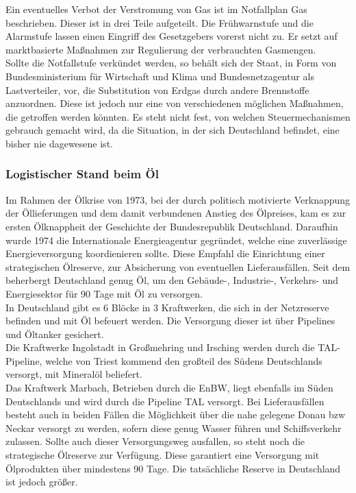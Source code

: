		Ein eventuelles Verbot der Verstromung von Gas ist im Notfallplan Gas beschrieben. Dieser ist in drei Teile aufgeteilt. Die Frühwarnstufe und die Alarmstufe lassen einen Eingriff des Gesetzgebers vorerst nicht zu. Er setzt auf marktbasierte Maßnahmen zur Regulierung der verbrauchten Gasmengen. \\
		
		Sollte die Notfallstufe verkündet werden, so behält sich der Staat, in Form von Bundesministerium für Wirtschaft und Klima und Bundesnetzagentur als Lastverteiler, vor, die Substitution von Erdgas durch andere Brennstoffe anzuordnen. Diese ist jedoch nur eine von verschiedenen möglichen Maßnahmen, die getroffen werden könnten. Es steht nicht fest, von welchen Steuermechanismen gebrauch gemacht wird, da die Situation, in der sich Deutschland befindet, eine bisher nie dagewesene ist. 
		
		\subsubsection{Logistischer Stand beim Öl}
		Im Rahmen der Ölkrise von 1973, bei der durch politisch motivierte Verknappung der Öllieferungen und dem damit verbundenen Anstieg des Ölpreises, kam es zur ersten Ölknappheit der Geschichte der Bundesrepublik Deutschland. Daraufhin wurde 1974 die Internationale Energieagentur gegründet, welche eine zuverlässige Energieversorgung koordienieren sollte. Diese Empfahl die Einrichtung einer strategischen Ölreserve, zur Absicherung von eventuellen Lieferausfällen. Seit dem beherbergt Deutschland genug Öl, um den Gebäude-, Industrie-, Verkehrs- und Energiesektor für 90 Tage mit Öl zu versorgen.\\
		
		In Deutschland gibt es 6 Blöcke in 3 Kraftwerken, die sich in der Netzreserve befinden und mit Öl befeuert werden. Die Versorgung dieser ist über Pipelines und Öltanker gesichert.\\
		Die Kraftwerke Ingolstadt in Großmehring und Irsching werden durch die TAL-Pipeline, welche von Triest kommend den großteil des Südens Deutschlands versorgt, mit Mineralöl beliefert.\\
		Das Kraftwerk Marbach, Betrieben durch die EnBW, liegt ebenfalls im Süden Deutschlands und wird durch die Pipeline TAL versorgt. Bei Lieferausfällen besteht auch in beiden Fällen die Möglichkeit über die nahe gelegene Donau bzw Neckar versorgt zu werden, sofern diese genug Wasser führen und Schiffsverkehr zulassen. Sollte auch dieser Versorgungsweg ausfallen, so steht noch die strategische Ölreserve zur Verfügung. Diese garantiert eine Versorgung mit Ölprodukten über mindestens 90 Tage. Die tatsächliche Reserve in Deutschland ist jedoch größer.\\
		
